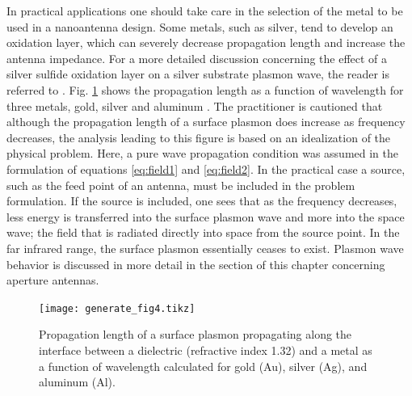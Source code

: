 \documentclass[11pt]{article}
\begin{document}
In practical applications one should take care in the selection of the metal to be used in a nanoantenna design. Some metals, such as silver, tend to develop an oxidation layer, which can severely decrease propagation length and increase the antenna impedance. For a more detailed discussion concerning the effect of a silver sulfide oxidation layer on a silver substrate plasmon wave, the reader is referred to \cite{Nevels2014}.
%
Fig. \ref{fig:plength} shows the propagation length as a function of wavelength for three metals, gold, silver and aluminum \cite{9783540339199}. The practitioner is cautioned that although the propagation length of a surface plasmon does increase as frequency decreases, the analysis leading to this figure is based on an idealization of the physical problem. Here, a pure wave propagation condition was assumed in the formulation of equations \eqref{eq:field1} and \eqref{eq:field2}. In the practical case a source, such as the feed point of an antenna, must be included in the problem formulation. If the source is included, one sees that as the frequency decreases, less energy is transferred into the surface plasmon wave and more into the space wave; the field that is radiated directly into space from the source point. In the far infrared range, the surface plasmon essentially ceases to exist. Plasmon wave behavior is discussed in more detail in the section of this chapter concerning aperture antennas.
%
\begin{figure}[t!]
  \centering
  {\texttt{[image: generate\_fig4.tikz]}}
  \caption{Propagation length of a surface plasmon propagating along the interface between a dielectric (refractive index 1.32) and a metal as a function of wavelength calculated for gold (Au), silver (Ag), and aluminum (Al).}
  \label{fig:plength}
\end{figure}
%
\end{document}
